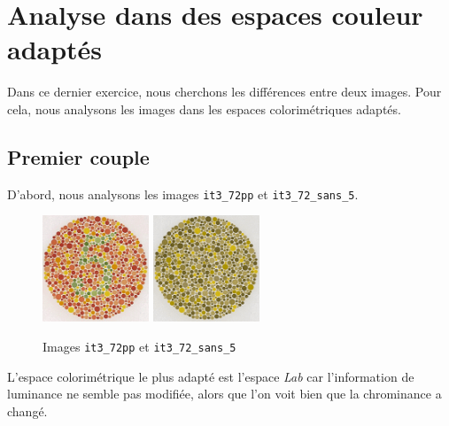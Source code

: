 \documentclass[a4paper,11pt]{article}
\begin{document}
\newpage

\section{Analyse dans des espaces couleur adaptés}

Dans ce dernier exercice, nous cherchons les différences entre deux 
images. Pour cela, nous analysons les images dans les espaces 
colorimétriques adaptés.\\

\subsection{Premier couple}

D'abord, nous analysons les images \texttt{it3\_72pp} et 
\texttt{it3\_72\_sans\_5}.

\begin{figure}[H]
  \begin{center}  
    \includegraphics[width=120px]{images/it3_72pp.png}
    \includegraphics[width=120px]{images/it3_72pp_sans_5.png}
    \caption{Images \texttt{it3\_72pp} et \texttt{it3\_72\_sans\_5}}
  \end{center}
\end{figure}

L'espace colorimétrique le plus adapté est l'espace \textit{Lab} car 
l'information de luminance ne semble pas modifiée, alors que l'on 
voit bien que la chrominance a changé.
\end{document}
